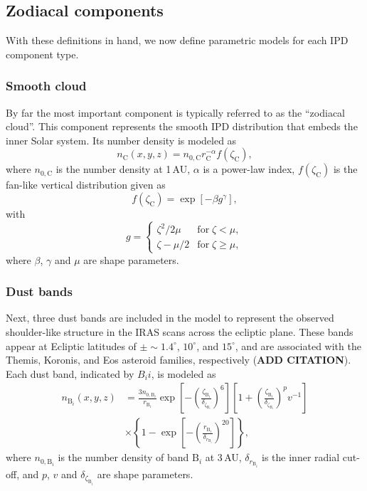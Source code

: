 \documentclass[twocolumn]{aa}
\begin{document}
\subsection{Zodiacal components}

With these definitions in hand, we now define parametric models for
each IPD component type.

\subsubsection{Smooth cloud}
By far the most important component is typically referred to as the
``zodiacal cloud''. This component represents the smooth IPD
distribution that embeds the inner Solar system. Its number density is
modeled as
\begin{equation}
    n_\mathrm{C}(x,y,z)=n_{0,
      \mathrm{C}}r_\mathrm{C}^{-\alpha}f(\zeta_\mathrm{C}),
    \label{eq:cloud}
\end{equation}
where $n_{0, \mathrm{C}}$ is the number density at 1\,AU, $\alpha$ is a 
power-law index, $f(\zeta_\mathrm{C})$ is the fan-like vertical 
distribution given as 
\begin{equation}
    f(\zeta_\mathrm{C}) = \exp {\left[-\beta g^\gamma \right]},
\end{equation}
with
\begin{equation}
    g = \begin{cases}
        \zeta^2/2\mu & \mathrm{for}\; \zeta < \mu,\\
        \zeta - \mu/2 & \mathrm{for}\; \zeta \geq \mu,
    \end{cases}
\end{equation}
where $\beta$, $\gamma$ and $\mu$ are shape parameters.

\subsubsection{Dust bands}
Next, three dust bands are included in the model to represent the
observed shoulder-like structure in the IRAS scans across the ecliptic
plane.  These bands appear at Ecliptic latitudes of $\pm \sim
1.4^\circ$, $10^\circ$, and $15^\circ$, and are associated with the
Themis, Koronis, and Eos asteroid families, respectively ({\bf ADD
  CITATION}). Each dust band, indicated by $B_ii$, is modeled as
\begin{align}
    n_{\mathrm{B}_i}(x,y,z) &= \frac{3 n_{0, \mathrm{B}_i}}{r_{\mathrm{B}_i}} \exp \left[-\left(\frac{\zeta_{\mathrm{B}_i}}{\delta_{\zeta_{\mathrm{B}_i}}}\right)^{6}\right]\left[1 + \left(\frac{\zeta_{\mathrm{B}_i}}{\delta_{\zeta_{\mathrm{B}_i}}}\right)^{p}v^{-1}\right] \\
    &\times\left\{1-\exp \left[-\left(\frac{r_{\mathrm{B}_i}}{\delta_{r_{\mathrm{B}_i}}}\right)^{20}\right]\right\},
\label{eq:band}
\end{align}
where $n_{0, \mathrm{B}_i}$ is the number density of band $\mathrm{B}_i$ 
at 3\,AU, $\delta_{r_{\mathrm{B}_i}}$ is the inner radial cut-off, and 
$p$, $v$ and $\delta_{\zeta_{\mathrm{B}_i}}$ are shape parameters.
\end{document}
